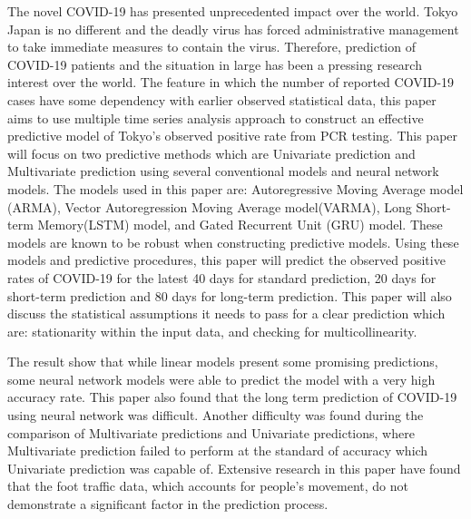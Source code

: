 \thispagestyle{plain}
The novel COVID-19 has presented unprecedented impact over the world. Tokyo Japan is no different and the deadly virus has forced administrative management to take immediate measures to contain the virus. Therefore, prediction of COVID-19 patients and the situation in large has been a pressing research interest over the world. The feature in which the number of reported COVID-19 cases have some dependency with earlier observed statistical data, this paper aims to use multiple time series analysis approach to construct an effective predictive model of Tokyo's observed positive rate from PCR testing. This paper will focus on two predictive methods which are Univariate prediction and Multivariate prediction using several conventional models and neural network models. The models used in this paper are: Autoregressive Moving Average model (ARMA), Vector Autoregression Moving Average model(VARMA), Long Short-term Memory(LSTM) model, and Gated Recurrent Unit (GRU) model. These models are known to be robust when constructing predictive models. Using these models and predictive procedures, this paper will predict the observed positive rates of COVID-19 for the latest 40 days for standard prediction, 20 days for short-term prediction and 80 days for long-term prediction. This paper will also discuss the statistical assumptions it needs to pass for a clear prediction which are: stationarity within the input data, and checking for multicollinearity.

The result show that while linear models present some promising predictions, some neural network models were able to predict the model with a very high accuracy rate. This paper also found that the long term prediction of COVID-19 using neural network was difficult. Another difficulty was found during the comparison of Multivariate predictions and Univariate predictions, where Multivariate prediction failed to perform at the standard of accuracy which Univariate prediction was capable of. Extensive research in this paper have found that the foot traffic data, which accounts for people's movement, do not demonstrate a significant factor in the prediction process. 
